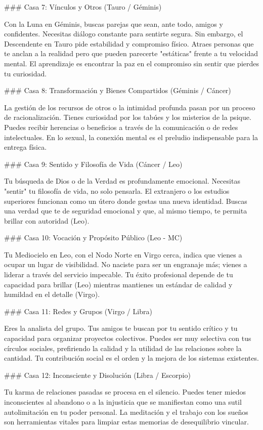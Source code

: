 ### Casa 7: Vínculos y Otros (Tauro / Géminis)

Con la Luna en Géminis, buscas parejas que sean, ante todo, amigos y confidentes. Necesitas diálogo constante para sentirte segura. Sin embargo, el Descendente en Tauro pide estabilidad y compromiso físico. Atraes personas que te anclan a la realidad pero que pueden parecerte "estáticas" frente a tu velocidad mental. El aprendizaje es encontrar la paz en el compromiso sin sentir que pierdes tu curiosidad.

### Casa 8: Transformación y Bienes Compartidos (Géminis / Cáncer)

La gestión de los recursos de otros o la intimidad profunda pasan por un proceso de racionalización. Tienes curiosidad por los tabúes y los misterios de la psique. Puedes recibir herencias o beneficios a través de la comunicación o de redes intelectuales. En lo sexual, la conexión mental es el preludio indispensable para la entrega física.

### Casa 9: Sentido y Filosofía de Vida (Cáncer / Leo)

Tu búsqueda de Dios o de la Verdad es profundamente emocional. Necesitas "sentir" tu filosofía de vida, no solo pensarla. El extranjero o los estudios superiores funcionan como un útero donde gestas una nueva identidad. Buscas una verdad que te de seguridad emocional y que, al mismo tiempo, te permita brillar con autoridad (Leo).

### Casa 10: Vocación y Propósito Público (Leo - MC)

Tu Mediocielo en Leo, con el Nodo Norte en Virgo cerca, indica que vienes a ocupar un lugar de visibilidad. No naciste para ser un engranaje más; vienes a liderar a través del servicio impecable. Tu éxito profesional depende de tu capacidad para brillar (Leo) mientras mantienes un estándar de calidad y humildad en el detalle (Virgo).

### Casa 11: Redes y Grupos (Virgo / Libra)

Eres la analista del grupo. Tus amigos te buscan por tu sentido crítico y tu capacidad para organizar proyectos colectivos. Puedes ser muy selectiva con tus círculos sociales, prefiriendo la calidad y la utilidad de las relaciones sobre la cantidad. Tu contribución social es el orden y la mejora de los sistemas existentes.

### Casa 12: Inconsciente y Disolución (Libra / Escorpio)

Tu karma de relaciones pasadas se procesa en el silencio. Puedes tener miedos inconscientes al abandono o a la injusticia que se manifiestan como una sutil autolimitación en tu poder personal. La meditación y el trabajo con los sueños son herramientas vitales para limpiar estas memorias de desequilibrio vincular.

